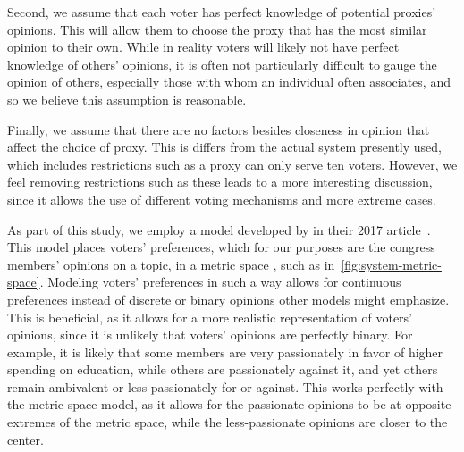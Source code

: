 Second, we assume that each voter has perfect knowledge of potential proxies' opinions.
This will allow them to choose the proxy that has the most similar opinion to their own.
While in reality voters will likely not have perfect knowledge of others' opinions,
it is often not particularly difficult to gauge the opinion of others, especially
those with whom an individual often associates, and so we believe this assumption is
reasonable.

Finally, we assume that there are no factors besides closeness in opinion that affect
the choice of proxy.
This is differs from the actual system presently used, which includes restrictions
such as a proxy can only serve ten voters.\cite{CERP2020}
However, we feel removing restrictions such as these leads to a more interesting
discussion, since it allows the use of different voting mechanisms and more extreme
cases.

As part of this study, we employ a model developed by  in
their 2017 article~\cite{Cohensius2017}.
This model places voters' preferences, which for our purposes are the congress
members' opinions on a topic, in a metric space \systemspace, such as
in~\autoref{fig:system-metric-space}.
Modeling voters' preferences in such a way allows for continuous preferences instead of
discrete or binary opinions other models might emphasize.
This is beneficial, as it allows for a more realistic representation of voters'
opinions, since it is unlikely that voters' opinions are perfectly binary.
For example, it is likely that some members are very passionately in favor of higher
spending on education, while others are passionately against it, and yet others
remain ambivalent or less-passionately for or against.
This works perfectly with the metric space model, as it allows for the passionate
opinions to be at opposite extremes of the metric space, while the less-passionate
opinions are closer to the center.

